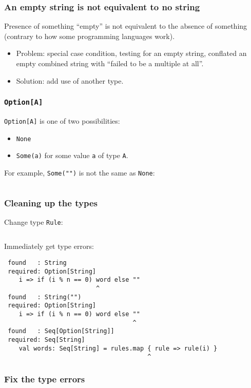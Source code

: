 \begin{frame}
  \frametitle{An empty string is not equivalent to no string}

  Presence of something ``empty'' is not equivalent to the absence of something (contrary to how some programming languages work).

  \begin{itemize}
  \item Problem: special case condition, testing for an empty string, conflated an empty combined string with ``failed to be a multiple at all''.
  \item Solution: add use of another type.
  \end{itemize}
\end{frame}

\begin{frame}[fragile]
  \frametitle{\texttt{Option[A]}}

  \texttt{Option[A]} is one of two possibilities:
  \begin{itemize}
  \item \texttt{None}
  \item \texttt{Some(a)} for some value \texttt{a} of type \texttt{A}.
  \end{itemize}

  For example, \texttt{Some("")} is not the same as \texttt{None}:
  \inputminted{scala}{OptionExample1.scala}
\end{frame}

\begin{frame}[fragile]
  \frametitle{Cleaning up the types}

  Change type \texttt{Rule}:
  \inputminted{scala}{FizzBuzz6.scala}

  Immediately get type errors:
  \begin{verbatim}
 found   : String
 required: Option[String]
    i => if (i % n == 0) word else ""
                         ^
 found   : String("")
 required: Option[String]
    i => if (i % n == 0) word else ""
                                   ^
 found   : Seq[Option[String]]
 required: Seq[String]
    val words: Seq[String] = rules.map { rule => rule(i) }
                                       ^
  \end{verbatim}
\end{frame}

\begin{frame}[fragile]
  \frametitle{Fix the type errors}

  \inputminted{scala}{FizzBuzz7.scala}

\end{frame}

